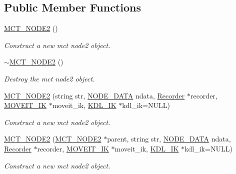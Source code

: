 \subsection*{Public Member Functions}
\begin{DoxyCompactItemize}
\item 
\mbox{\label{classMCT__NODE2_a79a6d3015439b33c46ba184dc314f5e4}} 
\hyperlink{classMCT__NODE2_a79a6d3015439b33c46ba184dc314f5e4}{M\+C\+T\+\_\+\+N\+O\+D\+E2} ()
\begin{DoxyCompactList}\small\item\em Construct a new mct node2 object. \end{DoxyCompactList}\item 
\mbox{\label{classMCT__NODE2_a180c6f50288efb2b93a44872b14e4d5e}} 
\hyperlink{classMCT__NODE2_a180c6f50288efb2b93a44872b14e4d5e}{$\sim$\+M\+C\+T\+\_\+\+N\+O\+D\+E2} ()
\begin{DoxyCompactList}\small\item\em Destroy the mct node2 object. \end{DoxyCompactList}\item 
\hyperlink{classMCT__NODE2_a729c4d4e44b9de40835e51abb915008f}{M\+C\+T\+\_\+\+N\+O\+D\+E2} (string str, \hyperlink{structNODE__DATA}{N\+O\+D\+E\+\_\+\+D\+A\+TA} ndata, \hyperlink{classRecorder}{Recorder} $\ast$recorder, \hyperlink{classMOVEIT__IK}{M\+O\+V\+E\+I\+T\+\_\+\+IK} $\ast$moveit\+\_\+ik, \hyperlink{classKDL__IK}{K\+D\+L\+\_\+\+IK} $\ast$kdl\+\_\+ik=N\+U\+LL)
\begin{DoxyCompactList}\small\item\em Construct a new mct node2 object. \end{DoxyCompactList}\item 
\hyperlink{classMCT__NODE2_a8a3bb30fd398361d821d04a10f311a68}{M\+C\+T\+\_\+\+N\+O\+D\+E2} (\hyperlink{classMCT__NODE2}{M\+C\+T\+\_\+\+N\+O\+D\+E2} $\ast$parent, string str, \hyperlink{structNODE__DATA}{N\+O\+D\+E\+\_\+\+D\+A\+TA} ndata, \hyperlink{classRecorder}{Recorder} $\ast$recorder, \hyperlink{classMOVEIT__IK}{M\+O\+V\+E\+I\+T\+\_\+\+IK} $\ast$moveit\+\_\+ik, \hyperlink{classKDL__IK}{K\+D\+L\+\_\+\+IK} $\ast$kdl\+\_\+ik=N\+U\+LL)
\begin{DoxyCompactList}\small\item\em Construct a new mct node2 object. \end{DoxyCompactList}\item 

\end{DoxyCompactItemize}
